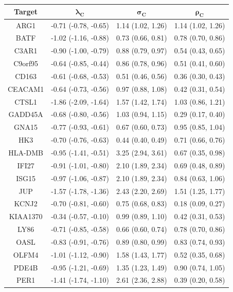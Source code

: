 \documentclass[../thesis.tex]{subfiles}
\begin{document}
\begin{table}[ht]
\centering
\begin{tabular}{cccc}
  \hline
{\textbf{Target}} & $\bm{\lambda_C}$ & $\bm{\sigma_C}$ & $\bm{\rho_C}$ \\ 
  \hline
ARG1 & -0.71 (-0.78, -0.65) & 1.14 (1.02, 1.26) & 1.14 (1.02, 1.26) \\ 
  BATF & -1.02 (-1.16, -0.88) & 0.73 (0.66, 0.81) & 0.78 (0.70, 0.86) \\ 
  C3AR1 & -0.90 (-1.00, -0.79) & 0.88 (0.79, 0.97) & 0.54 (0.43, 0.65) \\ 
  C9orf95 & -0.64 (-0.85, -0.44) & 0.86 (0.78, 0.96) & 0.51 (0.41, 0.60) \\ 
  CD163 & -0.61 (-0.68, -0.53) & 0.51 (0.46, 0.56) & 0.36 (0.30, 0.43) \\ 
  CEACAM1 & -0.64 (-0.73, -0.56) & 0.97 (0.88, 1.08) & 0.42 (0.31, 0.54) \\ 
  CTSL1 & -1.86 (-2.09, -1.64) & 1.57 (1.42, 1.74) & 1.03 (0.86, 1.21) \\ 
  GADD45A & -0.68 (-0.80, -0.56) & 1.03 (0.94, 1.15) & 0.29 (0.17, 0.40) \\ 
  GNA15 & -0.77 (-0.93, -0.61) & 0.67 (0.60, 0.73) & 0.95 (0.85, 1.04) \\ 
  HK3 & -0.70 (-0.76, -0.63) & 0.44 (0.40, 0.49) & 0.71 (0.66, 0.76) \\ 
  HLA-DMB & -0.95 (-1.41, -0.51) & 3.25 (2.94, 3.61) & 0.67 (0.35, 0.98) \\ 
  IFI27 & -0.91 (-1.01, -0.80) & 2.10 (1.89, 2.34) & 0.69 (0.48, 0.89) \\ 
  ISG15 & -0.97 (-1.06, -0.87) & 2.10 (1.89, 2.34) & 0.84 (0.63, 1.06) \\ 
  JUP & -1.57 (-1.78, -1.36) & 2.43 (2.20, 2.69) & 1.51 (1.25, 1.77) \\ 
  KCNJ2 & -0.70 (-0.81, -0.60) & 0.75 (0.68, 0.83) & 0.18 (0.09, 0.27) \\ 
  KIAA1370 & -0.34 (-0.57, -0.10) & 0.99 (0.89, 1.10) & 0.42 (0.31, 0.53) \\ 
  LY86 & -0.71 (-0.85, -0.58) & 0.66 (0.60, 0.74) & 0.78 (0.70, 0.86) \\ 
  OASL & -0.83 (-0.91, -0.76) & 0.89 (0.80, 0.99) & 0.83 (0.74, 0.93) \\ 
  OLFM4 & -1.01 (-1.12, -0.90) & 1.58 (1.43, 1.77) & 0.52 (0.35, 0.68) \\ 
  PDE4B & -0.95 (-1.21, -0.69) & 1.35 (1.23, 1.49) & 0.90 (0.74, 1.05) \\ 
  PER1 & -1.41 (-1.74, -1.10) & 2.61 (2.36, 2.88) & 0.39 (0.20, 0.58) \\ 

\end{tabular}
\end{table}
\end{document}
